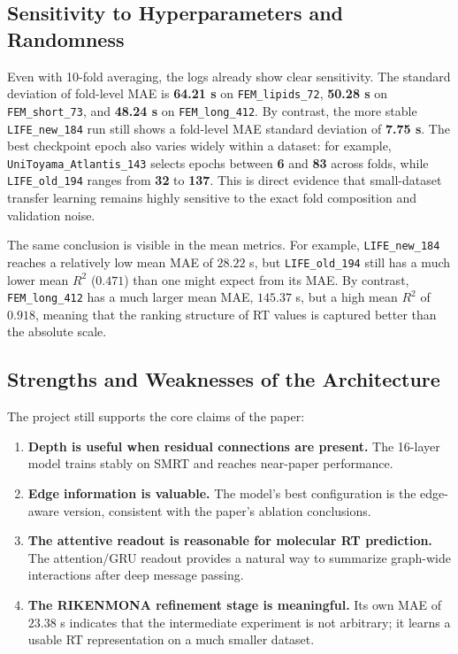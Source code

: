 \subsection{Sensitivity to Hyperparameters and Randomness}

Even with 10-fold averaging, the logs already show clear sensitivity. The standard deviation of fold-level MAE is \textbf{64.21 s} on \texttt{FEM\_lipids\_72}, \textbf{50.28 s} on \texttt{FEM\_short\_73}, and \textbf{48.24 s} on \texttt{FEM\_long\_412}. By contrast, the more stable \texttt{LIFE\_new\_184} run still shows a fold-level MAE standard deviation of \textbf{7.75 s}. The best checkpoint epoch also varies widely within a dataset: for example, \texttt{UniToyama\_Atlantis\_143} selects epochs between \textbf{6} and \textbf{83} across folds, while \texttt{LIFE\_old\_194} ranges from \textbf{32} to \textbf{137}. This is direct evidence that small-dataset transfer learning remains highly sensitive to the exact fold composition and validation noise.

The same conclusion is visible in the mean metrics. For example, \texttt{LIFE\_new\_184} reaches a relatively low mean MAE of \(28.22\) s, but \texttt{LIFE\_old\_194} still has a much lower mean \(R^2\) (\(0.471\)) than one might expect from its MAE. By contrast, \texttt{FEM\_long\_412} has a much larger mean MAE, \(145.37\) s, but a high mean \(R^2\) of \(0.918\), meaning that the ranking structure of RT values is captured better than the absolute scale.

\subsection{Strengths and Weaknesses of the Architecture}

The project still supports the core claims of the paper:

\begin{enumerate}
    \item \textbf{Depth is useful when residual connections are present.} The 16-layer model trains stably on SMRT and reaches near-paper performance.
    \item \textbf{Edge information is valuable.} The model's best configuration is the edge-aware version, consistent with the paper's ablation conclusions.
    \item \textbf{The attentive readout is reasonable for molecular RT prediction.} The attention/GRU readout provides a natural way to summarize graph-wide interactions after deep message passing.
    \item \textbf{The RIKENMONA refinement stage is meaningful.} Its own MAE of \(23.38\) s indicates that the intermediate experiment is not arbitrary; it learns a usable RT representation on a much smaller dataset.
\end{enumerate}

